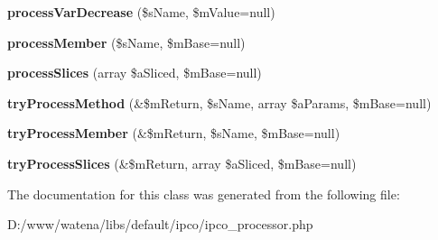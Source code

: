 \begin{DoxyCompactItemize}
\item 
\hypertarget{class_i_p_c_o___processor_ac2dfb19c0207ac04ec893a1672c884f5}{{\bfseries process\-Var\-Decrease} (\$s\-Name, \$m\-Value=null)}\label{class_i_p_c_o___processor_ac2dfb19c0207ac04ec893a1672c884f5}

\item 
\hypertarget{class_i_p_c_o___processor_a9b30ba56b6cc580dd00492bbad990c99}{{\bfseries process\-Member} (\$s\-Name, \$m\-Base=null)}\label{class_i_p_c_o___processor_a9b30ba56b6cc580dd00492bbad990c99}

\item 
\hypertarget{class_i_p_c_o___processor_a9502841900af28075ed56c3990cae6d0}{{\bfseries process\-Slices} (array \$a\-Sliced, \$m\-Base=null)}\label{class_i_p_c_o___processor_a9502841900af28075ed56c3990cae6d0}

\item 
\hypertarget{class_i_p_c_o___processor_ac78a4edb9911b14ee54341c8142a7beb}{{\bfseries try\-Process\-Method} (\&\$m\-Return, \$s\-Name, array \$a\-Params, \$m\-Base=null)}\label{class_i_p_c_o___processor_ac78a4edb9911b14ee54341c8142a7beb}

\item 
\hypertarget{class_i_p_c_o___processor_a19cc454dbc955a3684f8a234a6edf131}{{\bfseries try\-Process\-Member} (\&\$m\-Return, \$s\-Name, \$m\-Base=null)}\label{class_i_p_c_o___processor_a19cc454dbc955a3684f8a234a6edf131}

\item 
\hypertarget{class_i_p_c_o___processor_a45ac099c53cddda1c3e27308cf6ba6f0}{{\bfseries try\-Process\-Slices} (\&\$m\-Return, array \$a\-Sliced, \$m\-Base=null)}\label{class_i_p_c_o___processor_a45ac099c53cddda1c3e27308cf6ba6f0}

\end{DoxyCompactItemize}


The documentation for this class was generated from the following file\-:\begin{DoxyCompactItemize}
\item 
D\-:/www/watena/libs/default/ipco/ipco\-\_\-processor.\-php\end{DoxyCompactItemize}
